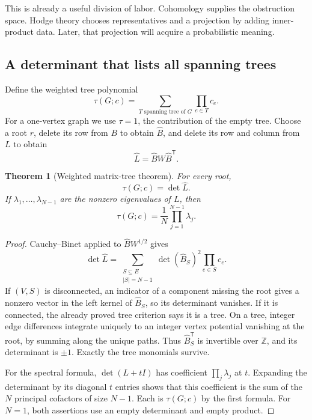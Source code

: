 \documentclass[11pt]{article}
\newtheorem{theorem}{Theorem}[section]
\theoremstyle{definition}
\theoremstyle{remark}
\newcommand{\Z}{\mathbb Z}
\begin{document}
This is already a useful division of labor. Cohomology supplies the obstruction space. Hodge theory chooses representatives and a projection by adding inner-product data. Later, that projection will acquire a probabilistic meaning.

\subsection{A determinant that lists all spanning trees}

Define the weighted tree polynomial
\[
 \tau(G;c)=\sum_{T\text{ spanning tree of }G}\prod_{e\in T}c_e.
\]
For a one-vertex graph we use $\tau=1$, the contribution of the empty tree. Choose a root $r$, delete its row from $B$ to obtain $\widehat B$, and delete its row and column from $L$ to obtain
\[
 \widehat L=\widehat B W\widehat B^{\mathsf T}.
\]

\begin{theorem}[Weighted matrix-tree theorem]\label{thm:glin-matrix-tree}
For every root,
\begin{equation}\label{eq:glin-matrix-tree}
 \tau(G;c)=\det\widehat L.
\end{equation}
If $\lambda_1,\ldots,\lambda_{N-1}$ are the nonzero eigenvalues of $L$, then
\begin{equation}\label{eq:glin-spectral-tree}
 \tau(G;c)=\frac1N\prod_{j=1}^{N-1}\lambda_j.
\end{equation}
\end{theorem}
\begin{proof}
Cauchy--Binet applied to $\widehat B W^{1/2}$ gives
\[
 \det\widehat L=
 \sum_{\substack{S\subseteq E\\|S|=N-1}}
 \det(\widehat B_S)^2\prod_{e\in S}c_e.
\]
If $(V,S)$ is disconnected, an indicator of a component missing the root gives a nonzero vector in the left kernel of $\widehat B_S$, so its determinant vanishes. If it is connected, the already proved tree criterion says it is a tree. On a tree, integer edge differences integrate uniquely to an integer vertex potential vanishing at the root, by summing along the unique paths. Thus $\widehat B_S^{\mathsf T}$ is invertible over $\Z$, and its determinant is $\pm1$. Exactly the tree monomials survive.

For the spectral formula, $\det(L+tI)$ has coefficient $\prod_j\lambda_j$ at $t$. Expanding the determinant by its diagonal $t$ entries shows that this coefficient is the sum of the $N$ principal cofactors of size $N-1$. Each is $\tau(G;c)$ by the first formula. For $N=1$, both assertions use an empty determinant and empty product.
\end{proof}
\end{document}
